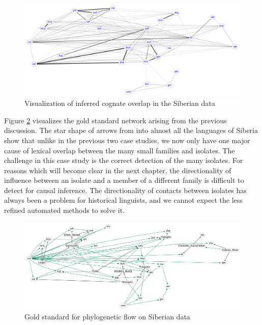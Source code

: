 \begin{figure}
 \includegraphics[width=\textwidth]{figures/cognacy-strength-siberia.pdf}
 \caption{Visualization of inferred cognate overlap in the Siberian data}
 \label{siberia-cognacy}
\end{figure}

Figure \ref{siberia-goldstandard-phylo} visualizes the gold standard network arising from the previous discussion. The star shape of arrows from  into almost all the languages of Siberia show that unlike in the previous two case studies, we now only have one major cause of lexical overlap between the many small families and isolates. The challenge in this case study is the correct detection of the many isolates. For reasons which will become clear in the next chapter, the directionality of influence between an isolate and a member of a different family is difficult to detect for causal inference. The directionality of contacts between isolates has always been a problem for historical linguists, and we cannot expect the less refined automated methods to solve it.

\begin{figure}
 \includegraphics[width=\textwidth]{figures/goldstandard-phylo-siberia.pdf}
 \caption{Gold standard for phylogenetic flow on Siberian data}
 \label{siberia-goldstandard-phylo}
\end{figure}

